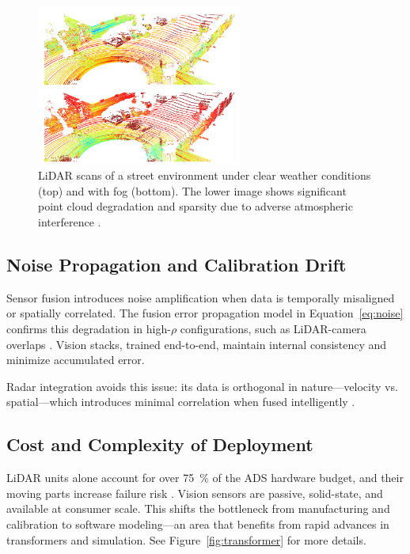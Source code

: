 \documentclass[12pt]{article}
\begin{document}
\begin{figure}[H]
    \centering
    \includegraphics[width=0.6\textwidth]{lidar_noise.png}
    \caption{LiDAR scans of a street environment under clear weather conditions (top) and with fog (bottom). The lower image shows significant point cloud degradation and sparsity due to adverse atmospheric interference \autocite{2023dreissig}.}
    \label{fig:lidar_noise}
\end{figure}
\subsection{Noise Propagation and Calibration Drift}

Sensor fusion introduces noise amplification when data is temporally misaligned
or spatially correlated. The fusion error propagation model in
Equation~\ref{eq:noise} confirms this degradation in high-$\rho$ configurations, such as LiDAR-camera overlaps \autocite{Rana2023PerceptionSystems}. Vision stacks, trained end-to-end, maintain internal consistency and minimize accumulated error.

Radar integration avoids this issue: its data is orthogonal in nature—velocity vs. spatial—which introduces minimal correlation when fused intelligently \autocite{Liao2024RadarVisionFusion}.

\subsection{Cost and Complexity of Deployment}

LiDAR units alone account for over \SI{75}{\percent} of the ADS hardware budget,
and their moving parts increase failure risk \autocite{Shetty2022LiDARvsCamera,
Sajjad2021ComparativeDetection}. Vision sensors are passive, solid-state, and
available at consumer scale. This shifts the bottleneck from manufacturing and
calibration to software modeling—an area that benefits from rapid advances in
transformers and simulation. See Figure~\ref{fig:transformer} for more details.
\end{document}
